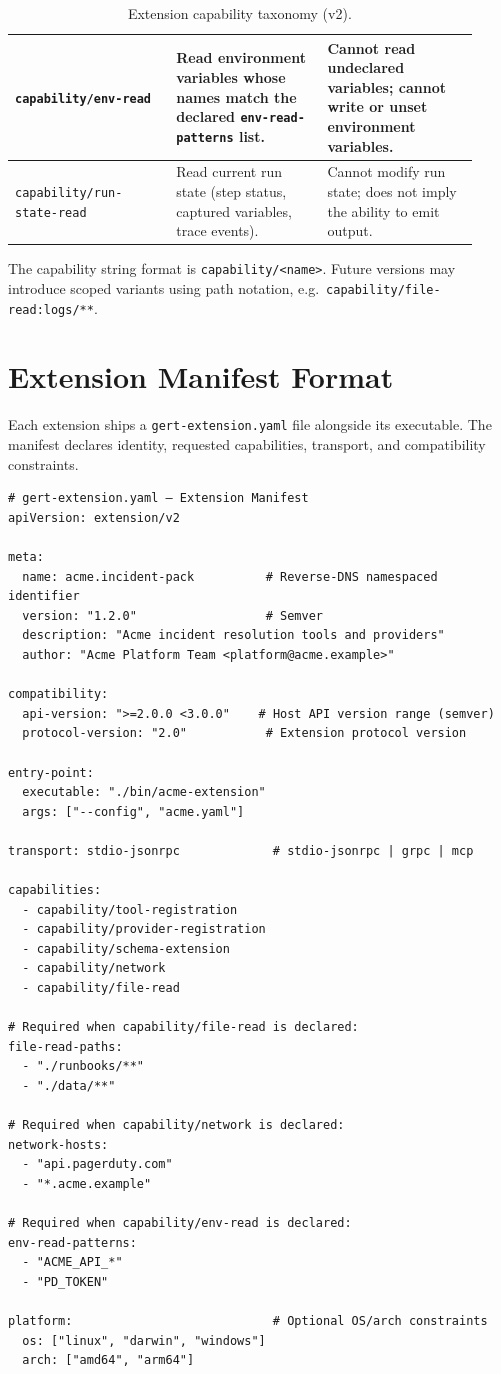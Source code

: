 \begin{table}[ht]
\begin{tabular}{p{0.32\linewidth}p{0.30\linewidth}p{0.30\linewidth}}
\hline
\texttt{capability/env-read} &
  Read environment variables whose names match the declared
  \texttt{env-read-patterns} list. &
  Cannot read undeclared variables; cannot write or unset environment
  variables. \\
\hline
\texttt{capability/run-state-read} &
  Read current run state (step status, captured variables, trace events). &
  Cannot modify run state; does not imply the ability to emit output. \\
\hline
\end{tabular}
\caption{Extension capability taxonomy (v2).}
\label{tab:capabilities}
\end{table}

The capability string format is \texttt{capability/<name>}.  Future versions
may introduce scoped variants using path notation, e.g.\
\texttt{capability/file-read:logs/**}.

\section{Extension Manifest Format}
\label{sec:ext-manifest}

Each extension ships a \texttt{gert-extension.yaml} file alongside its
executable.  The manifest declares identity, requested capabilities, transport,
and compatibility constraints.

\begin{verbatim}
# gert-extension.yaml — Extension Manifest
apiVersion: extension/v2

meta:
  name: acme.incident-pack          # Reverse-DNS namespaced identifier
  version: "1.2.0"                  # Semver
  description: "Acme incident resolution tools and providers"
  author: "Acme Platform Team <platform@acme.example>"

compatibility:
  api-version: ">=2.0.0 <3.0.0"    # Host API version range (semver)
  protocol-version: "2.0"           # Extension protocol version

entry-point:
  executable: "./bin/acme-extension"
  args: ["--config", "acme.yaml"]

transport: stdio-jsonrpc             # stdio-jsonrpc | grpc | mcp

capabilities:
  - capability/tool-registration
  - capability/provider-registration
  - capability/schema-extension
  - capability/network
  - capability/file-read

# Required when capability/file-read is declared:
file-read-paths:
  - "./runbooks/**"
  - "./data/**"

# Required when capability/network is declared:
network-hosts:
  - "api.pagerduty.com"
  - "*.acme.example"

# Required when capability/env-read is declared:
env-read-patterns:
  - "ACME_API_*"
  - "PD_TOKEN"

platform:                            # Optional OS/arch constraints
  os: ["linux", "darwin", "windows"]
  arch: ["amd64", "arm64"]
\end{verbatim}

